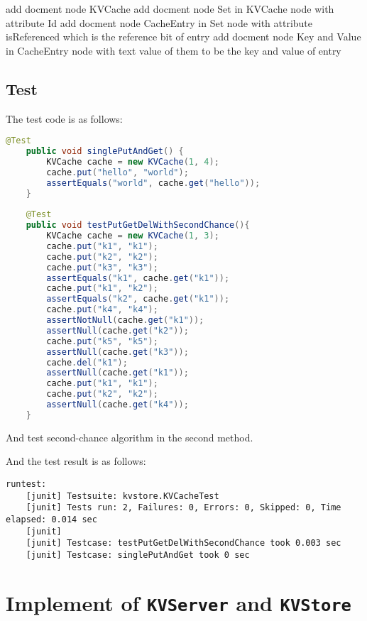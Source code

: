 \documentclass{article}
\begin{document}
\begin{algorithm}
    \begin{algorithmic}
            \State add docment node KVCache
                \State add docment node Set in KVCache node with attribute Id
                    \State add docment node CacheEntry in Set node with attribute isReferenced which is the reference bit of entry
                    \State add docment node Key and Value in CacheEntry node with text value of them to be the key and value of entry
                \EndWhile
            \EndWhile
        \EndProcedure
    \end{algorithmic}
\end{algorithm}
\subsection{Test}
The test code is as follows:
\begin{lstlisting}[language=java]
    @Test
    public void singlePutAndGet() {
        KVCache cache = new KVCache(1, 4);
        cache.put("hello", "world");
        assertEquals("world", cache.get("hello"));
    }
    
    @Test
    public void testPutGetDelWithSecondChance(){
    	KVCache cache = new KVCache(1, 3);
    	cache.put("k1", "k1");
    	cache.put("k2", "k2");
    	cache.put("k3", "k3");
    	assertEquals("k1", cache.get("k1"));
    	cache.put("k1", "k2");
    	assertEquals("k2", cache.get("k1"));
    	cache.put("k4", "k4");
    	assertNotNull(cache.get("k1"));
    	assertNull(cache.get("k2"));
    	cache.put("k5", "k5");
    	assertNull(cache.get("k3"));
    	cache.del("k1");
    	assertNull(cache.get("k1"));
    	cache.put("k1", "k1");
    	cache.put("k2", "k2");
    	assertNull(cache.get("k4"));
    }
\end{lstlisting}

And test second-chance algorithm in the second method.

And the test result is as follows:
\begin{lstlisting}
runtest:
    [junit] Testsuite: kvstore.KVCacheTest
    [junit] Tests run: 2, Failures: 0, Errors: 0, Skipped: 0, Time elapsed: 0.014 sec
    [junit] 
    [junit] Testcase: testPutGetDelWithSecondChance took 0.003 sec
    [junit] Testcase: singlePutAndGet took 0 sec
\end{lstlisting}

\section{Implement of \texttt{KVServer} and \texttt{KVStore}}
\end{document}
